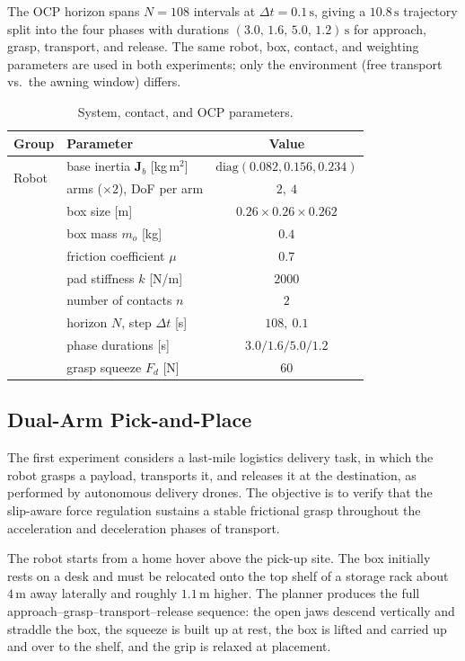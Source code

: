 \documentclass[letterpaper, 10 pt, conference]{ieeeconf}  %
\begin{document}
The OCP horizon spans $N=108$ intervals at $\Delta t = 0.1\,\mathrm{s}$, giving a $10.8\,\mathrm{s}$ trajectory split into the four phases with durations $(3.0,\,1.6,\,5.0,\,1.2)\,\mathrm{s}$ for approach, grasp, transport, and release. The same robot, box, contact, and weighting parameters are used in both experiments; only the environment (free transport vs.\ the awning window) differs.

\begin{table}[!t]
\centering
\caption{System, contact, and OCP parameters.}
\label{tab:params}
\footnotesize
\renewcommand{\arraystretch}{1.1}
\begin{tabular}{@{}llc@{}}
\toprule
\textbf{Group} & \textbf{Parameter} & \textbf{Value}\\
\midrule
\multirow{2}{*}{Robot}
 & base inertia $\boldsymbol{J}_b$ [kg\,m$^2$] & $\mathrm{diag}(0.082,0.156,0.234)$\\
 & arms ($\times2$), DoF per arm & $2,\ 4$\\
\addlinespace[1pt]
\multirow{2}{*}{Payload}
 & box size [m] & $0.26\times0.26\times0.262$\\
 & box mass $m_o$ [kg] & $0.4$\\
\addlinespace[1pt]
\multirow{3}{*}{Contact}
 & friction coefficient $\mu$ & $0.7$\\
 & pad stiffness $k$ [N/m] & $2000$\\
 & number of contacts $n$ & $2$\\
\addlinespace[1pt]
\multirow{3}{*}{OCP}
 & horizon $N$, step $\Delta t$ [s] & $108,\ 0.1$\\
 & phase durations [s] & $3.0/1.6/5.0/1.2$\\
 & grasp squeeze $F_d$ [N] & $60$\\
\bottomrule
\end{tabular}
\end{table}


\subsection{Dual-Arm Pick-and-Place}
The first experiment considers a last-mile logistics delivery task, in which the robot grasps a payload, transports it, and releases it at the destination, as performed by autonomous delivery drones.
The objective is to verify that the slip-aware force regulation sustains a stable frictional grasp throughout the acceleration and deceleration phases of transport.

The robot starts from a home hover above the pick-up site. The box initially rests on a desk and must be relocated onto the top shelf of a storage rack about $4\,\mathrm{m}$ away laterally and roughly $1.1\,\mathrm{m}$ higher. The planner produces the full approach--grasp--transport--release sequence: the open jaws descend vertically and straddle the box, the squeeze is built up at rest, the box is lifted and carried up and over to the shelf, and the grip is relaxed at placement.
\end{document}
